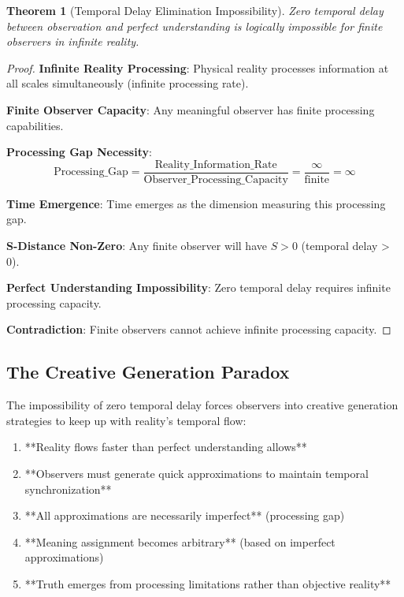\documentclass[12pt,a4paper]{article}
\newtheorem{theorem}{Theorem}[section]
\begin{document}
\begin{theorem}[Temporal Delay Elimination Impossibility]
Zero temporal delay between observation and perfect understanding is logically impossible for finite observers in infinite reality.
\end{theorem}

\begin{proof}
\textbf{Infinite Reality Processing}: Physical reality processes information at all scales simultaneously (infinite processing rate).

\textbf{Finite Observer Capacity}: Any meaningful observer has finite processing capabilities.

\textbf{Processing Gap Necessity}: 
$$\text{Processing\_Gap} = \frac{\text{Reality\_Information\_Rate}}{\text{Observer\_Processing\_Capacity}} = \frac{\infty}{\text{finite}} = \infty$$

\textbf{Time Emergence}: Time emerges as the dimension measuring this processing gap.

\textbf{S-Distance Non-Zero}: Any finite observer will have $S > 0$ (temporal delay > 0).

\textbf{Perfect Understanding Impossibility}: Zero temporal delay requires infinite processing capacity.

\textbf{Contradiction}: Finite observers cannot achieve infinite processing capacity.
\end{proof}

\subsection{The Creative Generation Paradox}

The impossibility of zero temporal delay forces observers into creative generation strategies to keep up with reality's temporal flow:

\begin{enumerate}
\item **Reality flows faster than perfect understanding allows**
\item **Observers must generate quick approximations to maintain temporal synchronization**
\item **All approximations are necessarily imperfect** (processing gap)
\item **Meaning assignment becomes arbitrary** (based on imperfect approximations)
\item **Truth emerges from processing limitations rather than objective reality**
\end{enumerate}
\end{document}
